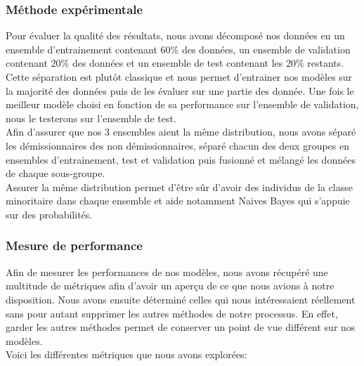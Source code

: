 \documentclass{ceri/sty/rapport}
\begin{document}
\subsubsection{Méthode expérimentale}

Pour évaluer la qualité des résultats, nous avons décomposé nos données en un ensemble d'entrainement contenant 60\% des données, un ensemble de validation contenant 20\% des données et un ensemble de test contenant les 20\% restants. Cette séparation est plutôt classique et nous permet d'entrainer nos modèles sur la majorité des données puis de les évaluer sur une partie des donnée. Une fois le meilleur modèle choisi en fonction de sa performance sur l'ensemble de validation, nous le testerons sur l'ensemble de test.\\
Afin d'assurer que nos 3 ensembles aient la même distribution, nous avons séparé les démissionnaires des non démissionnaires, séparé chacun des deux groupes en ensembles d'entrainement, test et validation puis fusionné et mélangé les données de chaque sous-groupe.\\
Assurer la même distribution permet d'être sûr d'avoir des individus de la classe minoritaire dans chaque ensemble et aide notamment Naives Bayes qui s'appuie sur des probabilités.\\

\subsubsection{Mesure de performance}
Afin de mesurer les performances de nos modèles, nous avons récupéré une multitude de métriques afin d'avoir un aperçu de ce que nous avions à notre disposition. Nous avons ensuite déterminé celles qui nous intéressaient réellement sans pour autant supprimer les autres méthodes de notre processus. En effet, garder les autres méthodes permet de conserver un point de vue différent sur nos modèles.\\
Voici les différentes métriques que nous avons explorées:\\
\end{document}
